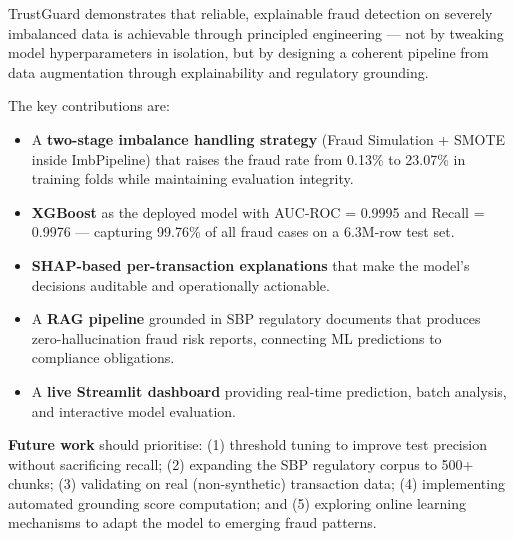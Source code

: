 \documentclass[12pt,a4paper]{article}
\begin{document}
\label{sec:conclusion}

TrustGuard demonstrates that reliable, explainable fraud detection on severely imbalanced data is achievable through principled engineering --- not by tweaking model hyperparameters in isolation, but by designing a coherent pipeline from data augmentation through explainability and regulatory grounding.

The key contributions are:

\begin{itemize}[noitemsep]
  \item A \textbf{two-stage imbalance handling strategy} (Fraud Simulation + SMOTE inside ImbPipeline) that raises the fraud rate from 0.13\% to 23.07\% in training folds while maintaining evaluation integrity.
  \item \textbf{XGBoost} as the deployed model with AUC-ROC = 0.9995 and Recall = 0.9976 --- capturing 99.76\% of all fraud cases on a 6.3M-row test set.
  \item \textbf{SHAP-based per-transaction explanations} that make the model's decisions auditable and operationally actionable.
  \item A \textbf{RAG pipeline} grounded in SBP regulatory documents that produces zero-hallucination fraud risk reports, connecting ML predictions to compliance obligations.
  \item A \textbf{live Streamlit dashboard} providing real-time prediction, batch analysis, and interactive model evaluation.
\end{itemize}

\textbf{Future work} should prioritise: (1) threshold tuning to improve test precision without sacrificing recall; (2) expanding the SBP regulatory corpus to 500+ chunks; (3) validating on real (non-synthetic) transaction data; (4) implementing automated grounding score computation; and (5) exploring online learning mechanisms to adapt the model to emerging fraud patterns.
\end{document}
